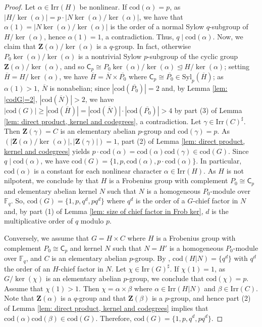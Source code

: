 \documentclass[9pt]{article}
\begin{document}
\begin{proof}
	Let $\alpha\in\mathrm{Irr}(H)$ be nonlinear.
	If $\mathrm{cod}(\alpha)=p$,
	as $|H/\ker(\alpha)|=p\cdot |N\ker(\alpha)/\ker(\alpha)|$,
	we have that $\alpha(1)=|N\ker(\alpha)/\ker(\alpha)|$ 
	is the order of a normal Sylow $q$-subgroup of $H/\ker(\alpha)$,
	hence $\alpha(1)=1$, a contradiction. 
	Thus, $q\mid \mathrm{cod}(\alpha)$.
	Now, we claim that $\mathbf{Z}(\alpha)/\ker(\alpha)$ is a $q$-group.
	In fact, otherwise $P_0\ker(\alpha)/\ker(\alpha)$ is a nontrivial Sylow $p$-subgroup of the cyclic group $\mathbf{Z}(\alpha)/\ker(\alpha)$,
	and so $\mathsf{C}_{p}\cong P_0\ker(\alpha)/\ker(\alpha)\unlhd H/\ker(\alpha)$;
    setting $\overline{H}=H/\ker(\alpha)$,
    we have $\overline{H}=\overline{N}\times \overline{P_0}$ where $\mathsf{C}_{p}\cong\overline{P_0}\in \mathrm{Syl}_{p}(\overline{H})$;
	as $\alpha(1)>1$,
	$\overline{N}$ is nonabelian; 
    since $|\mathrm{cod}(\overline{P_0})|=2$ and, 
	by Lemma \ref{lem: |codG|=2}, $|\mathrm{cod}(\overline{N})|>2$,
	we have $|\mathrm{cod}(G)|\geq |\mathrm{cod}(\overline{H})|=|\mathrm{cod}(\overline{N})|\cdot |\mathrm{cod}(\overline{P_0})|>4$ by part (3) of Lemma \ref{lem: direct product, kernel and codegrees}, a contradiction.
	Let $\gamma\in \mathrm{Irr}(C)^\sharp$.
	Then $\mathbf{Z}(\gamma)=C$ is an elementary abelian $p$-group and $\mathrm{cod}(\gamma)=p$.
	As $(|\mathbf{Z}(\alpha)/\ker(\alpha)|,|\mathbf{Z}(\gamma)|)=1$,
	 part (2) of Lemma \ref{lem: direct product, kernel and codegrees} yields $p \cdot \mathrm{cod}(\alpha)=\mathrm{cod}(\alpha)\mathrm{cod}(\gamma)\in \mathrm{cod}(G)$.
	Since $q\mid \mathrm{cod}(\alpha)$,
	we have $\mathrm{cod}(G)=\{ 1,p,\mathrm{cod}(\alpha),p\cdot \mathrm{cod}(\alpha) \}$.
	In particular, $\mathrm{cod}(\alpha)$ is a constant for each nonlinear character $\alpha \in \mathrm{Irr}(H)$.
	As $H$ is not nilpotent, we conclude by \cite[Theorem A]{qian2023} that 
    $H$ is a Frobenius group with complement $P_0\cong \mathsf{C}_{p}$ and elementary abelian kernel $N$
	such that $N$ is a homogeneous $P_0$-module over $\mathbb{F}_q$.
	So, $\mathrm{cod}(G)=\{ 1,p,q^{d}, pq^{d} \}$ where $q^d$ is the order of a $G$-chief factor in $N$ and,
	by part (1) of Lemma \ref{lem: size of chief factor in Frob ker}, 
    $d$ is the multiplicative order of $q$ modulo $p$.
	
	Conversely, we assume that $G=H\times C$ where $H$ is a Frobenius group with complement $P_0\cong \mathsf{C}_{p}$ and kernel $N$
	such that $N=H'$ is a homogeneous $P_0$-module over $\mathbb{F}_q$,
	and $C$ is an elementary abelian $p$-group.
	By \cite[Theorem A]{qian2023}, $\mathrm{cod}(H|N)=\{ q^{d} \}$ with $q^{d}$ the order of an $H$-chief factor in $N$.
    Let $\chi\in \mathrm{Irr}(G)^\sharp$.
    If $\chi(1)=1$, as $G/\ker(\chi)$ is an elementary abelian $p$-group,
	we conclude that $\mathrm{cod}(\chi)=p$.
    Assume that $\chi(1)>1$.
	Then $\chi=\alpha\times \beta$ where $\alpha\in \mathrm{Irr}(H|N)$ and $\beta\in \mathrm{Irr}(C)$.
    Note that $\mathbf{Z}(\alpha)$ is a $q$-group and that $\mathbf{Z}(\beta)$ is a $p$-group,
	and hence part (2) of Lemma \ref{lem: direct product, kernel and codegrees} implies that $\mathrm{cod}(\alpha)\mathrm{cod}(\beta)\in \mathrm{cod}(G)$.
    Therefore, $\mathrm{cod}(G)=\{ 1,p,q^{d},pq^{d} \}$.
\end{proof}
\end{document}
